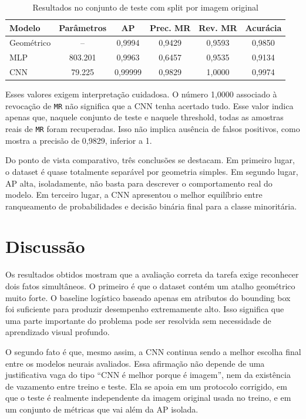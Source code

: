 \documentclass[12pt]{article}
\begin{document}
\begin{table}[ht]
\centering
\caption{Resultados no conjunto de teste com split por imagem original}
\label{tab:resultados}
\begin{tabular}{lccccc}
\toprule
Modelo & Parâmetros & AP & Prec. MR & Rev. MR & Acurácia \\
\midrule
Geométrico & -- & 0,9994 & 0,9429 & 0,9593 & 0,9850 \\
MLP & 803.201 & 0,9963 & 0,6457 & 0,9535 & 0,9134 \\
CNN & 79.225 & 0,99999 & 0,9829 & 1,0000 & 0,9974 \\
\bottomrule
\end{tabular}
\end{table}

Esses valores exigem interpretação cuidadosa. O número 1,0000 associado à
revocação de \texttt{MR} não significa que a CNN tenha acertado tudo. Esse
valor indica apenas que, naquele conjunto de teste e naquele threshold, todas
as amostras reais de \texttt{MR} foram recuperadas. Isso não implica ausência
de falsos positivos, como mostra a precisão de 0,9829, inferior a 1.

Do ponto de vista comparativo, três conclusões se destacam. Em primeiro lugar,
o dataset é quase totalmente separável por geometria simples. Em segundo lugar,
AP alta, isoladamente, não basta para descrever o comportamento real do modelo.
Em terceiro lugar, a CNN apresentou o melhor equilíbrio entre ranqueamento de
probabilidades e decisão binária final para a classe minoritária.

\section{Discussão}

Os resultados obtidos mostram que a avaliação correta da tarefa exige reconhecer
dois fatos simultâneos. O primeiro é que o dataset contém um atalho geométrico
muito forte. O baseline logístico baseado apenas em atributos do bounding box
foi suficiente para produzir desempenho extremamente alto. Isso significa que
uma parte importante do problema pode ser resolvida sem necessidade de
aprendizado visual profundo.

O segundo fato é que, mesmo assim, a CNN continua sendo a melhor escolha final
entre os modelos neurais avaliados. Essa afirmação não depende de uma
justificativa vaga do tipo ``CNN é melhor porque é imagem'', nem da existência
de vazamento entre treino e teste. Ela se apoia em um protocolo corrigido, em
que o teste é realmente independente da imagem original usada no treino, e em
um conjunto de métricas que vai além da AP isolada.
\end{document}
